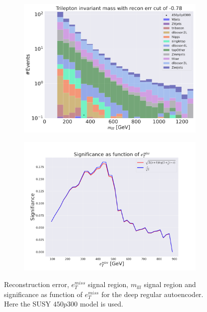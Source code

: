 \begin{figure}[H]
    \hfill
    \begin{subfigure}{.49\textwidth}
        \includegraphics[width=\textwidth]{Figures/AE_testing/big/3lep/b_data_recon_big_rm3_feats_sig_450p0p0300_mlll_recon_errcut_-0.78.pdf}
        \caption{}
        \label{fig:AE_3lep_big_mlll_450_3}
    \end{subfigure}
    \hfill   
    \begin{subfigure}{.49\textwidth}
        \includegraphics[width=\textwidth]{Figures/AE_testing/big/3lep/significance_etmiss_450p0p0300_-0.7824137709201433.pdf}
        \caption{}
        \label{fig:AE_3lep_big_signi_450_3}
    \end{subfigure}
    \hfill      
    \caption[3lep deep network | $450p300$ | AE | 3]{Reconstruction error, $e_T^{miss}$ signal region, $m_{lll}$ signal region and significance as function of 
    $e_T^{miss}$ for the deep regular autoencoder. Here the SUSY $450p300$ model is used.}
    \label{fig:AE_3lep_big_rec_sig_signi_450_3}
\end{figure}


